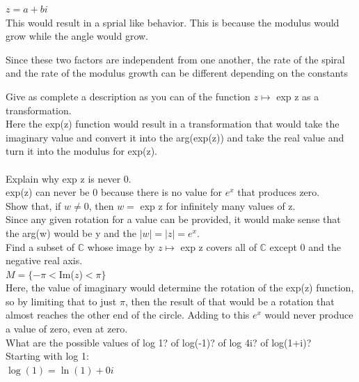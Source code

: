\documentclass[12pt]{article}
\begin{document}
$z = a + bi$\\

This would result in a sprial like behavior. 
This is because the modulus would grow while the angle would grow.

Since these two factors are independent from one another, the rate of the spiral and the rate of the modulus growth can be different depending on the constants 

 Give as complete a description as you can of the function $ z \mapsto$ exp z as a transformation.\\

Here the exp(z) function would result in a transformation that would take the imaginary value and convert it into the arg(exp(z)) and take the real value and turn it into the modulus for exp(z).\\

\\


 Explain why exp z is never 0.\\

exp(z) can never be 0 because there is no value for $e^x$ that produces zero.\\


 Show that, if $w \ne 0$, then $w =$ exp z for infinitely many values of z.\\

Since any given rotation for a value can be provided, it would make sense that the arg(w) would be y and the $|w| = |z| = e^x$.\\


 Find a subset of $\mathbb{C}$ whose image by $z \mapsto$ exp z covers all of $\mathbb{C}$ except 0 and the negative real axis.\\

$M = \{ -\pi < $Im($z$)$ < \pi\}$\\
Here, the value of imaginary would determine the rotation of the exp(z) function, so by limiting that to just $\pi$, then the result of that would be a rotation that almost reaches the other end of the circle.
Adding to this $e^x$ would never produce a value of zero, even at zero.\\


 What are the possible values of log 1? of log(-1)? of log 4i? of log(1+i)?\\

Starting with log 1:\\
$\log(1) = \ln(1) + 0i$\\
\end{document}

